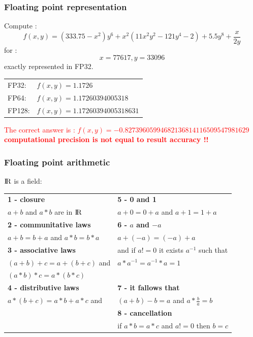 \begin{frame}[containsverbatim]
\frametitle{Floating point representation}
Compute :
$$
f(x,y) = (333.75 - x^2 ) y^6 + x^2 (11 x^2 y^2 - 121 y^4 - 2) + 5.5 y^8 + \frac{x}{2 y}
$$
for :
$$
x = 77617, y = 33096
$$
exactly represented in FP32.

\begin{center}
\begin{table}
\begin{tabular}{ll} 
FP32: & $f(x,y) = 1.1726$ \\
FP64: & $f(x,y) = 1.17260394005318$ \\
FP128: & $f(x,y) = 1.17260394005318631$ \\
\end{tabular}
\end{table}
\end{center}

\textcolor{red}{The correct answer is : $f(x,y) = -0.82739605994682136814116509547981629$}
\\

\textcolor{red}{\textbf{computational precision is not equal to result accuracy !!}}



\end{frame}


\begin{frame}[containsverbatim]
\frametitle{Floating point arithmetic}
${\rm I\!R}$ is a field:
{\footnotesize
\begin{center}
\begin{table}
\begin{tabular}{|l|l|} 
\hline
\textbf{1 - closure}  & \textbf{5 - 0 and 1}  \\
$a + b$ and $a * b$ are in ${\rm I\!R}$ &  $a + 0 = 0 + a$ and $a + 1 = 1 + a$ \\
\hline
\textbf{2 - communitative laws}  & \textbf{6 - $a$ and $-a$}  \\
$a + b = b + a$  and $a * b = b * a$ &  $a + (-a) = (-a) + a$ \\
\hline
\textbf{3 - associative laws}  &  and if $a != 0$ it exists $a^{-1}$ such that \\
$(a + b) + c = a + (b + c)$  and  &  $a * a^{-1} = a^{-1} * a = 1$ \\
$(a * b) * c = a * (b * c)$ & \\
\hline
\textbf{4 - distributive laws}  &  \textbf{7 - it fallows that} \\
$a * (b + c) = a * b + a * c$  and  &  $(a + b) -b = a$ and $a * \frac{b}{a} = b$ \\
\hline
 &  \textbf{8 - cancellation} \\
 & if $a * b = a * c$ and $a != 0$ then $b = c$  \\
\hline
\end{tabular}
\end{table}
\end{center}
}
\end{frame}




